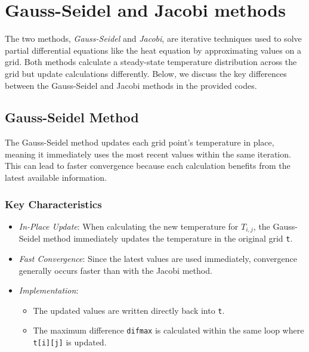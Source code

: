 \documentclass[11pt,a4paper]{article}
\begin{document}
\section{Gauss-Seidel and Jacobi methods}

The two methods,
\emph{Gauss-Seidel} and \emph{Jacobi},
are iterative techniques used to solve partial
differential equations like the heat equation by
approximating values on a grid.
Both methods calculate a steady-state temperature
distribution across the grid but update calculations differently.
Below, we discuss the key differences
between the Gauss-Seidel and Jacobi methods in the provided codes.

\subsection{Gauss-Seidel Method}

The Gauss-Seidel method updates each grid point's temperature in place,
meaning it immediately uses the most recent values within the same
iteration.
This can lead to faster convergence because each calculation
benefits from the latest available information.

\subsubsection{Key Characteristics}

\begin{itemize}
  \item
        \emph{In-Place Update}:
        When calculating the new temperature for \(T_{i,j}\),
        the Gauss-Seidel method immediately updates the
        temperature in the original grid \texttt{t}.
  \item
        \emph{Fast Convergence}:
        Since the latest values are used immediately,
        convergence generally occurs faster than with the Jacobi method.
  \item
        \emph{Implementation}:

        \begin{itemize}
          \item
                The updated values are written directly back into \texttt{t}.
          \item
                The maximum difference \texttt{difmax} is calculated within the same
                loop where \texttt{t[i][j]} is updated.
        \end{itemize}
\end{itemize}
\end{document}
